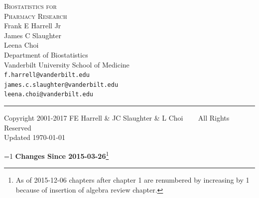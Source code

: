 \documentclass{report}
\begin{document}
\begin{flushright}
\Huge
\textsc{Biostatistics for\\Pharmacy Research}\\[2ex]
\huge Frank E Harrell Jr \\ James C Slaughter \\ Leena Choi \\
\Large
Department of Biostatistics \\
Vanderbilt University School of Medicine \\
\texttt{f.harrell@vanderbilt.edu} \\ \texttt{james.c.slaughter@vanderbilt.edu} \\ \texttt{leena.choi@vanderbilt.edu} 
\small
\end{flushright}
\rule{\linewidth}{1mm}
\begin{center}
\vspace{.5in}
\small
Copyright 2001-2017 FE Harrell \& JC Slaughter \& L Choi ~~~ All Rights Reserved
\\ \hfill \scriptsize Updated \today
\end{center}
\fi

\thispagestyle{empty}
\pagestyle{headings}

\setcounter{tocdepth}{1}


\tableofcontents

\def\changeHistoryShow{0}     %
\ifnum\changeHistoryShow=1
\bigskip
\need 3.5in
\textbf{Changes Since 2015-03-26}\footnote{As of 2015-12-06 chapters after
chapter 1 are renumbered by increasing by 1 because of insertion of algebra
review chapter.}
\end{document}

